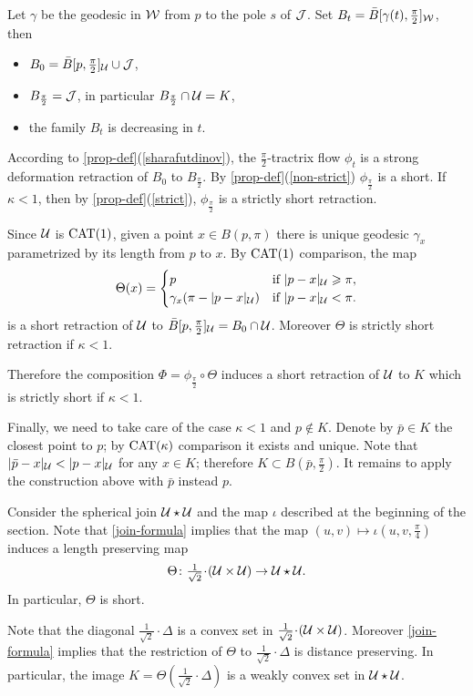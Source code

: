 \documentclass[oneside,a4paper, 12pt]{article}
\begin{document}
Let $\gamma$ be the geodesic in $\mathcal{W}$ from $p$ to the pole $s$ of $\mathcal{J}$.
Set $B_t=\bar B[\gamma(t),\tfrac\pi2]_{\mathcal{W}}$, then
\begin{itemize}
\item $B_0=\bar B[p,\tfrac\pi2]_{\mathcal{U}}\cup \mathcal{J}$,
\item $B_{\frac\pi2}=\mathcal{J}$, in particular $B_{\frac\pi2}\cap \mathcal{U}=K$,
\item the family $B_t$ is decreasing in $t$.
\end{itemize}
According to \ref{prop-def}(\ref{sharafutdinov}), the $\tfrac\pi2$-tractrix flow $\phi_t$ is a strong deformation retraction of $B_0$ to $B_{\frac\pi2}$.
By \ref{prop-def}(\ref{non-strict}) $\phi_{\frac\pi2}$ is a short.
If $\kappa<1$, then by \ref{prop-def}(\ref{strict}), $\phi_{\frac\pi2}$ is a strictly short retraction.

Since ${\mathcal{U}}$ is $\mathrm{CAT}(1)$,
given a point $x\in B(p,\pi)$ there is unique geodesic $\gamma_x$ parametrized by its length from $p$ to $x$. 
By $\mathrm{CAT}(1)$ comparison, the map 
\[\Theta(x)=
\begin{cases}
p&\text{if\ }|p-x|_{\mathcal{U}}\geqslant \pi,
\\
\gamma_x(\pi-|p-x|_{\mathcal{U}})&\text{if\ }|p-x|_{\mathcal{U}}< \pi.
\end{cases}
\]
is a short retraction of ${\mathcal{U}}$ to $\bar B[p,\tfrac\pi2]_{\mathcal{U}}=B_0\cap \mathcal{U}$.
Moreover $\Theta$ is strictly short retraction if $\kappa<1$.

Therefore the composition $\Phi=\phi_{\frac\pi2}\circ\Theta$ induces a short retraction of ${\mathcal{U}}$ to $K$
which is strictly short if $\kappa<1$.

Finally, we need to take care of the case $\kappa<1$ and $p\notin K$.
Denote by $\bar p\in K$ the closest point to $p$; by $\mathrm{CAT}(\kappa)$ comparison it exists and unique.
Note that $|\bar p-x|_{\mathcal{U}}< |p-x|_{\mathcal{U}}$ for any $x\in K$;
therefore $K\subset B(\bar p,\tfrac\pi2)$. 
It remains to apply the construction above with $\bar p$ instead $p$.
\qeds


Consider the spherical join $\mathcal{U}\star\mathcal{U}$ and the map $\iota$ described at the beginning of the section. 
Note that \ref{join-formula} implies that the map $(u,v)\mapsto \iota(u,v,\tfrac\pi4)$
induces a length preserving map 
\[\Theta\:{\tfrac1{\sqrt{2}}}\cdot(\spc{U}\times\spc{U})\to\spc{U}\star\spc{U}.\]
In particular, $\Theta$ is short.

Note that the diagonal $\tfrac1{\sqrt{2}}\cdot\Delta$ is a convex set in $\tfrac1{\sqrt{2}}\cdot(\spc{U}\times\spc{U})$.
Moreover \ref{join-formula} implies that the restriction of $\Theta$ to $\tfrac1{\sqrt{2}}\cdot\Delta$ is distance preserving.
In particular, the image $K=\Theta(\tfrac1{\sqrt{2}}\cdot\Delta)$ is a weakly convex set in $\mathcal{U}\star\mathcal{U}$.
\end{document}
